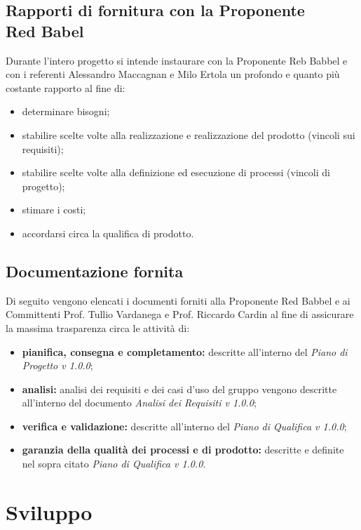 \documentclass[NormeDiProgetto.tex]{subfiles}
\begin{document}
\subsection[Rapporti di fornitura con la Proponente Red Babel]{Rapporti di fornitura con la Proponente \\ Red Babel}
Durante l'intero progetto si intende instaurare con la Proponente Reb Babbel e con i referenti Alessandro Maccagnan e Milo Ertola un profondo e quanto più costante rapporto al fine di:
\begin{itemize}
	\item determinare bisogni;
	\item stabilire scelte volte alla realizzazione e realizzazione del prodotto (vincoli sui requisiti);
	\item stabilire scelte volte alla definizione ed esecuzione di processi (vincoli di progetto);
	\item stimare i costi;
	\item accordarsi circa la qualifica di prodotto.
\end{itemize}
\subsection{Documentazione fornita}
Di seguito vengono elencati i documenti forniti alla Proponente Red Babbel e ai Committenti Prof. Tullio Vardanega e Prof. Riccardo Cardin al fine di assicurare la massima trasparenza circa le attività di:
\begin{itemize}
	\item \textbf{pianifica, consegna e completamento:} descritte all'interno del \textit{Piano di Progetto v 1.0.0};
	\item \textbf{analisi:} analisi dei requisiti e dei casi d'uso del gruppo vengono descritte all'interno del documento \textit{Analisi dei Requisiti v 1.0.0};
	\item \textbf{verifica e validazione:} descritte all'interno del \textit{Piano di Qualifica v	1.0.0};
	\item \textbf{garanzia della qualità dei processi e di prodotto:} descritte e definite nel sopra citato \textit{Piano di Qualifica v 1.0.0}.
\end{itemize}
\section{Sviluppo}
\end{document}
